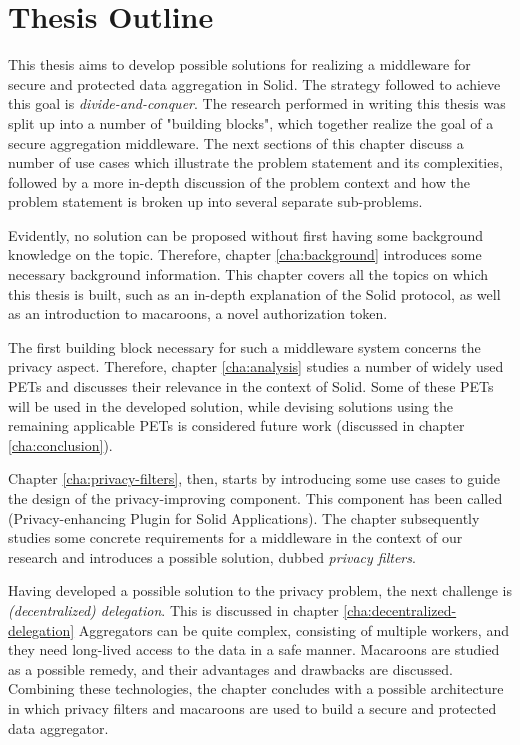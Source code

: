 \newpage
\section{Thesis Outline}
\label{sec:outline}
This thesis aims to develop possible solutions for realizing a middleware for secure and protected data aggregation in Solid. The strategy followed to achieve this goal is \textit{divide-and-conquer}. The research performed in writing this thesis was split up into a number of "building blocks", which together realize the goal of a secure aggregation middleware. The next sections of this chapter discuss a number of use cases which illustrate the problem statement and its complexities, followed by a more in-depth discussion of the problem context and how the problem statement is broken up into several separate sub-problems.

Evidently, no solution can be proposed without first having some background knowledge on the topic. Therefore, chapter \ref{cha:background} introduces some necessary background information. This chapter covers all the topics on which this thesis is built, such as an in-depth explanation of the Solid protocol, as well as an introduction to macaroons, a novel authorization token. 

The first building block necessary for such a middleware system concerns the privacy aspect. Therefore, chapter \ref{cha:analysis} studies a number of widely used \acrlong{PETs} and discusses their relevance in the context of Solid. Some of these \acrshort{PETs} will be used in the developed solution, while devising solutions using the remaining applicable \acrshort{PETs} is considered future work (discussed in chapter \ref{cha:conclusion}).

Chapter \ref{cha:privacy-filters}, then, starts by introducing some use cases to guide the design of the privacy-improving component. This component has been called \middleware{} (Privacy-enhancing Plugin for Solid Applications). The chapter subsequently studies some concrete requirements for a middleware in the context of our research and introduces a possible solution, dubbed \textit{privacy filters}. 

Having developed a possible solution to the privacy problem, the next challenge is \textit{(decentralized) delegation}. This is discussed in chapter \ref{cha:decentralized-delegation} Aggregators can be quite complex, consisting of multiple workers, and they need long-lived access to the data in a safe manner. Macaroons are studied as a possible remedy, and their advantages and drawbacks are discussed. Combining these technologies, the chapter concludes with a possible architecture in which privacy filters and macaroons are used to build a secure and protected data aggregator.

